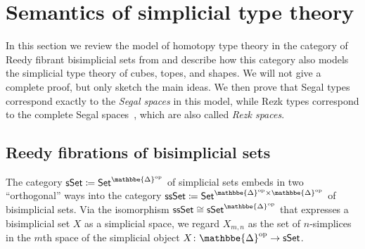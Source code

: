 \documentclass[12pt]{amsart}
\theoremstyle{plain}
\theoremstyle{definition}
\theoremstyle{remark}
\numberwithin{equation}{section}
\newcommand{\defeq}{\coloneqq}
\newcommand{\univtype}{\mathcal{U}}
\newcommand{\Set}{\mathsf{Set}}
\newcommand{\sSet}{\mathsf{sSet}}
\newcommand{\ssSet}{\mathsf{ssSet}}
\newcommand{\DDelta}{\mathbbe{\Delta}}
\newcommand{\op}{\mathrm{op}}
\begin{document}



\appendix

\section{Semantics of simplicial type theory}
\label{sec:semantics}

In this section we review the model of homotopy type theory in the category of Reedy fibrant bisimplicial sets from \cite{elreedy} and describe how this category also models the simplicial type theory of cubes, topes, and shapes.
We will not give a complete proof, but only sketch the main ideas.
We then prove that Segal types correspond exactly to the \emph{Segal spaces} in this model, while Rezk types correspond to the complete Segal spaces~\cite{css}, which are also called \emph{Rezk spaces}.

\subsection{Reedy fibrations of bisimplicial sets}

The category $\sSet \defeq\Set^{\DDelta^\op}$ of simplicial sets embeds in two ``orthogonal'' ways into the category $\ssSet \defeq \Set^{\DDelta^\op \times \DDelta^\op}$ of bisimplicial sets. Via the isomorphism $\ssSet \cong \sSet^{\DDelta^\op}$ that expresses a bisimplicial set $X$ as a simplicial space, we regard $X_{m,n}$ as the set of $n$-simplices in the $m$th space of the simplicial object $X \colon \DDelta^\op \to \sSet$. 
\end{document}
